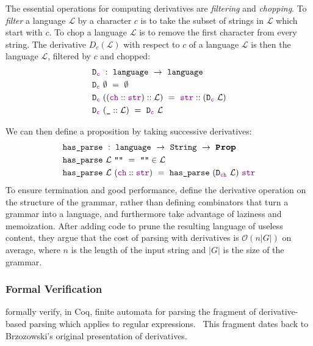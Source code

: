     The essential operations for computing derivatives are \emph{filtering} and \emph{chopping}.  To \emph{filter} a language $\mathcal L$ by a character $c$ is to take the subset of strings in $\mathcal L$ which start with $c$.  To chop a language $\mathcal L$ is to remove the first character from every string.  The derivative $D_c(\mathcal L)$ with respect to $c$ of a language $\mathcal L$ is then the language $\mathcal L$, filtered by $c$ and chopped:
\begin{align*}
&\texttt{D}_{\textcolor{violet}{\texttt{c}}}~:~\texttt{language}~\to~\texttt{language} \\
&\texttt{D}_{\textcolor{violet}{\texttt{c}}}~\emptyset~=~\emptyset \\
&\texttt{D}_{\textcolor{violet}{\texttt{c}}}~((\textcolor{violet}{\texttt{ch}}::\textcolor{violet}{\texttt{str}})::\mathcal L)~=~\textcolor{violet}{\texttt{str}}::(\texttt{D}_{\textcolor{violet}{\texttt{c}}}~\mathcal{L}) \\
&\texttt{D}_{\textcolor{violet}{\texttt{c}}}~(\texttt{\_}::\mathcal L)~=~\texttt{D}_{\textcolor{violet}{\texttt{c}}}~\mathcal{L}
\end{align*}

      We can then define a  proposition by taking successive derivatives:
\begin{align*}
&\fname{has\_parse}~:~\coqtype{language}~\to~\coqtype{String}~\to~\Prop \\
&\fname{has\_parse}~\mathcal{L}~\str{}~=~\str{}\in\mathcal{L} \\
&\fname{has\_parse}~\mathcal{L}~(\cons{\farg{ch}}{\farg{str}})~=~\fname{has\_parse}~(\fname{D\ensuremath{_{\farg{ch}}}}~\mathcal L)~\farg{str}
\end{align*}
      To ensure termination and good performance, \citeauthor*{Derivs} define the derivative operation on the structure of the grammar, rather than defining combinators that turn a grammar into a language, and furthermore take advantage of laziness and memoization.  After adding code to prune the resulting language of useless content, they argue that the cost of parsing with derivatives is $\mathcal O(n|G|)$ on average, where $n$ is the length of the input string and $|G|$ is the size of the grammar.
      
    \subsubsection{Formal Verification}
       formally verify, in Coq, finite automata for parsing the fragment of derivative-based parsing which applies to regular expressions.~\cite{DerivsCoq}  This fragment dates back to Brzozowski's original presentation of derivatives.~\cite{BrzozowskiDerivs}
  
